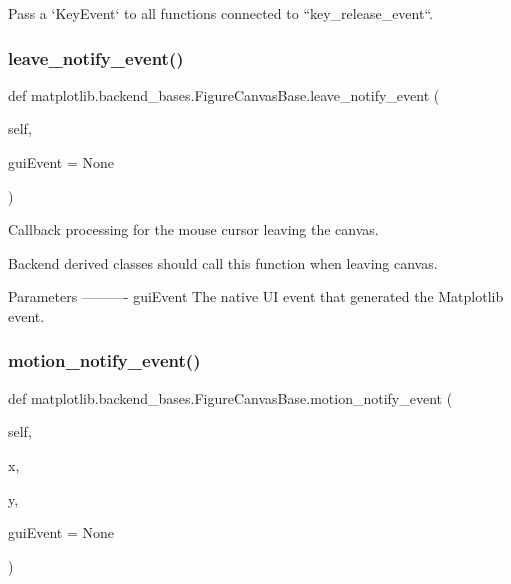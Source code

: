 \begin{DoxyVerb}Pass a `KeyEvent` to all functions connected to ``key_release_event``.
\end{DoxyVerb}
 \mbox{\label{classmatplotlib_1_1backend__bases_1_1FigureCanvasBase_adeb2d10d64a18ca4855b3493032aaf2b}} 
\subsubsection{\texorpdfstring{leave\+\_\+notify\+\_\+event()}{leave\_notify\_event()}}
{\footnotesize\ttfamily def matplotlib.\+backend\+\_\+bases.\+Figure\+Canvas\+Base.\+leave\+\_\+notify\+\_\+event (\begin{DoxyParamCaption}\item[{}]{self,  }\item[{}]{gui\+Event = {\ttfamily None} }\end{DoxyParamCaption})}

\begin{DoxyVerb}Callback processing for the mouse cursor leaving the canvas.

Backend derived classes should call this function when leaving
canvas.

Parameters
----------
guiEvent
    The native UI event that generated the Matplotlib event.
\end{DoxyVerb}
 \mbox{\label{classmatplotlib_1_1backend__bases_1_1FigureCanvasBase_a20dd9c5eaf95d0b8f3712ca83dbb8707}} 
\subsubsection{\texorpdfstring{motion\+\_\+notify\+\_\+event()}{motion\_notify\_event()}}
{\footnotesize\ttfamily def matplotlib.\+backend\+\_\+bases.\+Figure\+Canvas\+Base.\+motion\+\_\+notify\+\_\+event (\begin{DoxyParamCaption}\item[{}]{self,  }\item[{}]{x,  }\item[{}]{y,  }\item[{}]{gui\+Event = {\ttfamily None} }\end{DoxyParamCaption})}

